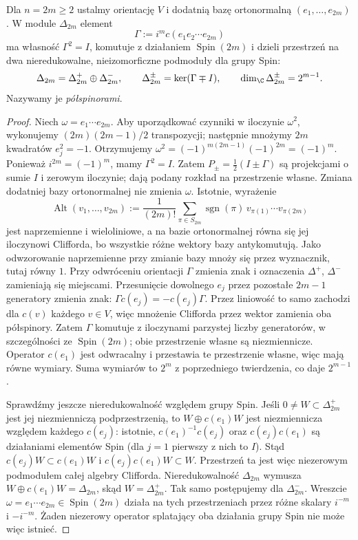 \begin{stwierdzenie}
\label{prop:lin31-spin-chiral}
Dla $n=2m\geq2$ ustalmy orientację $V$ i dodatnią bazę
ortonormalną $(e_1,\ldots,e_{2m})$. W module $\Delta_{2m}$
element
\[
 \Gamma:=i^m c(e_1e_2\cdots e_{2m})
\]
ma własność $\Gamma^2=I$, komutuje z działaniem
$\operatorname{Spin}(2m)$ i dzieli przestrzeń
na dwa nieredukowalne, nieizomorficzne podmoduły dla grupy Spin:
\[
 \Delta_{2m}=\Delta^+_{2m}\oplus\Delta^-_{2m},
 \qquad
 \Delta^\pm_{2m}=\ker(\Gamma\mp I),\qquad
 \dim_\C\Delta^\pm_{2m}=2^{m-1}.
\]
Nazywamy je \emph{półspinorami}.
\end{stwierdzenie}
\begin{proof}
Niech $\omega=e_1\cdots e_{2m}$. Aby uporządkować czynniki
w iloczynie $\omega^2$, wykonujemy $(2m)(2m-1)/2$ transpozycji;
następnie mnożymy $2m$ kwadratów $e_j^2=-1$.
Otrzymujemy
$\omega^2=(-1)^{m(2m-1)}(-1)^{2m}=(-1)^m$.
Ponieważ $i^{2m}=(-1)^m$, mamy $\Gamma^2=I$.
Zatem $P_\pm=\tfrac12(I\pm\Gamma)$ są projekcjami
o sumie $I$ i zerowym iloczynie; dają podany rozkład na przestrzenie własne.
Zmiana dodatniej bazy ortonormalnej nie zmienia $\omega$.
Istotnie, wyrażenie
\[
 \operatorname{Alt}(v_1,\ldots,v_{2m})
 :=\frac{1}{(2m)!}
   \sum_{\pi\in S_{2m}}\operatorname{sgn}(\pi)\,
    v_{\pi(1)}\cdots v_{\pi(2m)}
\]
jest naprzemienne i wieloliniowe, a na bazie ortonormalnej
równa się jej iloczynowi Clifforda, bo wszystkie różne
wektory bazy antykomutują. Jako odwzorowanie naprzemienne
przy zmianie bazy mnoży się przez wyznacznik, tutaj równy $1$.
Przy odwróceniu orientacji $\Gamma$ zmienia znak i oznaczenia
$\Delta^+$, $\Delta^-$ zamieniają się miejscami.
Przesunięcie dowolnego $e_j$ przez pozostałe
$2m-1$ generatory zmienia znak:
$\Gamma c(e_j)=-c(e_j)\Gamma$.
Przez liniowość to samo zachodzi dla $c(v)$ każdego $v\in V$,
więc mnożenie Clifforda przez wektor zamienia oba półspinory.
Zatem $\Gamma$ komutuje z iloczynami
parzystej liczby generatorów, w szczególności
ze $\operatorname{Spin}(2m)$; obie przestrzenie
własne są niezmiennicze. Operator
$c(e_1)$ jest odwracalny i przestawia
te przestrzenie własne, więc mają równe
wymiary. Suma wymiarów to $2^m$ z poprzedniego
twierdzenia, co daje $2^{m-1}$.

Sprawdźmy jeszcze nieredukowalność względem grupy Spin.
Jeśli $0\ne W\subset\Delta^+_{2m}$ jest jej niezmienniczą
podprzestrzenią, to $W\oplus c(e_1)W$ jest niezmiennicza
względem każdego $c(e_j)$: istotnie,
$c(e_1)^{-1}c(e_j)$ oraz $c(e_j)c(e_1)$ są działaniami
elementów Spin (dla $j=1$ pierwszy z nich to $I$).
Stąd $c(e_j)W\subset c(e_1)W$ i
$c(e_j)c(e_1)W\subset W$.
Przestrzeń ta jest więc niezerowym podmodułem całej algebry
Clifforda. Nieredukowalność $\Delta_{2m}$ wymusza
$W\oplus c(e_1)W=\Delta_{2m}$, skąd $W=\Delta^+_{2m}$.
Tak samo postępujemy dla $\Delta^-_{2m}$.
Wreszcie $\omega=e_1\cdots e_{2m}\in\operatorname{Spin}(2m)$
działa na tych przestrzeniach przez różne skalary
$i^{-m}$ i $-i^{-m}$. Żaden niezerowy operator splatający
oba działania grupy Spin nie może więc istnieć.
\end{proof}

